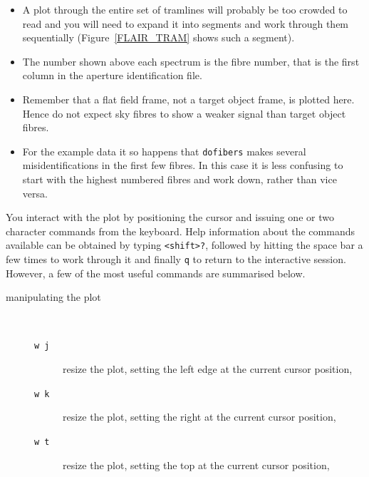 \documentclass[twoside,11pt]{starlink}
\begin{document}
\begin{enumerate}
  \begin{itemize}

    \item A plot through the entire set of tramlines will probably be
     too crowded to read and you will need to expand it into segments and
     work through them sequentially (Figure~\ref{FLAIR_TRAM} shows such a
     segment).

    \item The number shown above each spectrum is the fibre number, that
     is the first column in the aperture identification file.

    \item Remember that a flat field frame, not a target object frame,
     is plotted here.  Hence do not expect sky fibres to show a weaker
     signal than target object fibres.

    \item For the example data it so happens that \texttt{dofibers} makes
     several misidentifications in the first few fibres.  In this case
     it is less confusing to start with the highest numbered fibres
     and work down, rather than vice versa.

  \end{itemize}

   You interact with the plot by positioning the cursor and issuing
   one or two character commands from the keyboard.  Help information
   about the commands available can be obtained by typing \texttt{<shift>?}, followed by hitting the space bar a few times to work
   through it and finally \texttt{q} to return to the interactive session.
   However, a few of the most useful commands are summarised below.

  \begin{description}

    \item[manipulating the plot] ~

    \begin{description}

      \item[\texttt{w~j}] resize the plot, setting the left edge at the
       current cursor position,

      \item[\texttt{w~k}] resize the plot, setting the right at the
       current cursor position,

      \item[\texttt{w~t}] resize the plot, setting the top at the
       current cursor position,


\end{description}
\end{description}
\end{enumerate}
\end{document}
